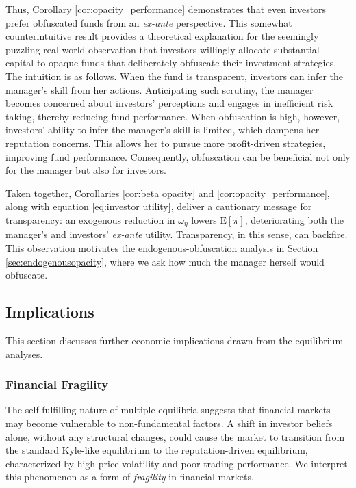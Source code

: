  Thus, Corollary \ref{cor:opacity_performance} demonstrates that even investors prefer obfuscated funds from an \textit{ex-ante} perspective. This somewhat counterintuitive result provides a theoretical explanation for the seemingly puzzling real-world observation that investors willingly allocate substantial capital to opaque funds that deliberately obfuscate their investment strategies. The intuition is as follows. When the fund is transparent, investors can infer the manager's skill from her actions. Anticipating such scrutiny, the manager becomes concerned about investors' perceptions and engages in inefficient risk taking, thereby reducing fund performance. When obfuscation is high, however, investors' ability to infer the manager's skill is limited, which dampens her reputation concerns. This allows her to pursue more profit-driven strategies, improving fund performance. Consequently, obfuscation can be beneficial not only for the manager but also for investors.
 
Taken together, Corollaries \ref{cor:beta opacity} and \ref{cor:opacity_performance}, along with equation \eqref{eq:investor utility}, deliver a cautionary message for transparency: an exogenous reduction in $\omega_{\eta}$ lowers $\mathrm{E}[\pi]$, deteriorating both the manager's and investors' \textit{ex-ante} utility. Transparency, in this sense, can backfire. This observation motivates the endogenous-obfuscation analysis in Section \ref{sec:endogenousopacity}, where we ask how much the manager herself would obfuscate.

\subsection{Implications}\label{ss:implications}
This section discusses further economic implications drawn from the equilibrium analyses.

\subsubsection{Financial Fragility}\label{sss:fragility}

The self-fulfilling nature of multiple equilibria suggests that financial markets may become vulnerable to non-fundamental factors. A shift in investor beliefs alone, without any structural changes, could cause the market to transition from the standard Kyle-like equilibrium to the reputation-driven equilibrium, characterized by high price volatility and poor trading performance.
We interpret this phenomenon as a form of \textit{fragility} in financial markets.

